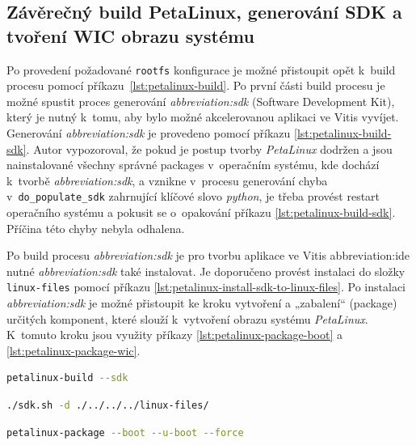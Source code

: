 \documentclass[a4paper, twoside, 11pt]{article}
\begin{document}
	\subsection{Závěrečný build PetaLinux, generování SDK a tvoření WIC obrazu systému}
	Po provedení požadované \texttt{rootfs} konfigurace je možné přistoupit opět k~build procesu pomocí příkazu~\ref{lst:petalinux-build}. Po první části build procesu je možné spustit proces generování \textit{\gls{abbreviation:sdk}} (Software Development Kit), který je nutný k~tomu, aby bylo možné akcelerovanou aplikaci ve Vitis vyvíjet. Generování \textit{\gls{abbreviation:sdk}} je provedeno pomocí příkazu \ref{lst:petalinux-build-sdk}. Autor vypozoroval, že pokud je postup tvorby \textit{PetaLinux} dodržen a jsou nainstalované všechny správné packages v~operačním systému, kde dochází k~tvorbě \textit{\gls{abbreviation:sdk}}, a vznikne v~procesu generování chyba v~\texttt{do\_populate\_sdk} zahrnující klíčové slovo \textit{python}, je třeba provést restart operačního systému a pokusit se o~opakování příkazu \ref{lst:petalinux-build-sdk}. Příčina této chyby nebyla odhalena.\par
	Po build procesu \textit{\gls{abbreviation:sdk}} je pro tvorbu aplikace ve Vitis \gls{abbreviation:ide} nutné \textit{\gls{abbreviation:sdk}} také instalovat. Je doporučeno provést instalaci do složky \texttt{linux-files} pomocí příkazu \ref{lst:petalinux-install-sdk-to-linux-files}.
	Po instalaci \textit{\gls{abbreviation:sdk}} je možné přistoupit ke kroku vytvoření a „zabalení“ (package) určitých komponent, které slouží k~vytvoření obrazu systému \textit{PetaLinux}. K~tomuto kroku jsou využity příkazy \ref{lst:petalinux-package-boot} a \ref{lst:petalinux-package-wic}.\par


\begin{lstlisting}[language={sh}, caption={Příkaz pro aktivování build procesu SDK}, label= {lst:petalinux-build-sdk}, morekeywords={petalinux-build, petalinux-package, petalinux-config}]
petalinux-build --sdk\end{lstlisting}

\begin{lstlisting}[language={sh}, caption={Příkaz pro inslataci SDK}, label= {lst:petalinux-install-sdk-to-linux-files}, morekeywords={petalinux-build, petalinux-package, petalinux-config}]
./sdk.sh -d ./../../../linux-files/\end{lstlisting}

\begin{lstlisting}[language={sh}, caption={Příkaz pro zabalení boot komponent pro tvorbu obrazu systému.}, label= {lst:petalinux-package-boot}, morekeywords={petalinux-build, petalinux-package, petalinux-config}]
petalinux-package --boot --u-boot --force\end{lstlisting}
\end{document}
